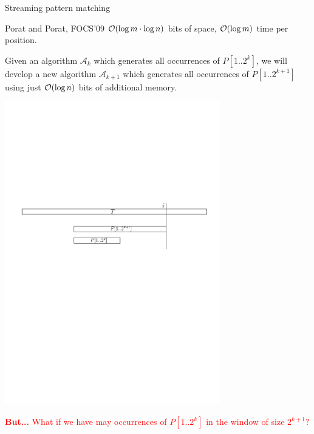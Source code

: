 \begin{frame}{Streaming pattern matching}
    \begin{mylemblock}{Porat and Porat, FOCS'09}
    $\mathcal{O}(\log m\cdot \log n)$ bits of space, $\mathcal{O}(\log m)$ time per position.
    \end{mylemblock}


    \bigskip
     Given an algorithm $\mathcal{A}_{k}$ which generates all occurrences of
    $P[1..2^{k}]$, we will develop a new algorithm
    $\mathcal{A}_{k+1}$ which generates all occurrences of $P[1..2^{k+1}]$ using just $\mathcal{O}(\log n)$ bits of additional memory.
    
    \medskip
    \begin{overlayarea}{\textwidth}{3.5cm}
    \begin{center}
    \includegraphics[width=0.7\textwidth]{pictures/more}
    \end{center}
    \end{overlayarea}
    \centering \textcolor{red}{\textbf{But...} What if we have may occurrences of $P[1..2^{k}]$ in the window of size $2^{k+1}$?}
    \end{frame}
    
    
    

